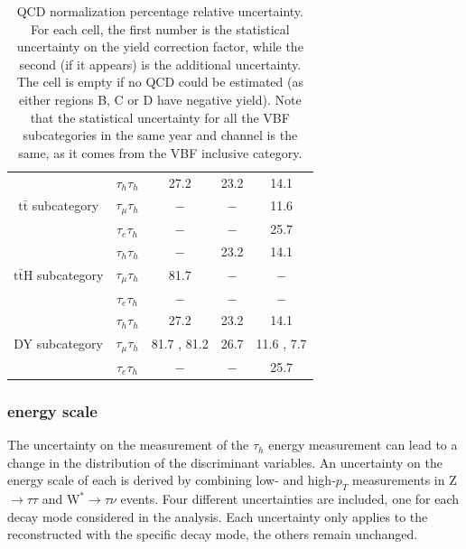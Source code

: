 \documentclass[../main.tex]{subfiles}
\begin{document}
\begin{table}[!h]
\begin{center}
\begin{tabular}{c | c | c | c | c}
                                        & $\tau_h\tau_h$   & 27.2         & 23.2         & 14.1         \\
    $\text{t}\bar{\text{t}}$ subcategory& $\tau_\mu\tau_h$ & $-$          & $-$          & 11.6         \\
                                        & $\tau_e\tau_h$   & $-$          & $-$          & 25.7         \\
    \hline
                                        & $\tau_h\tau_h$   & $-$          & 23.2         & 14.1         \\
    $\text{t}\bar{\text{t}}$H subcategory                    & $\tau_\mu\tau_h$ & 81.7         & $-$          & $-$          \\
                                        & $\tau_e\tau_h$   & $-$          & $-$          & $-$          \\
    \hline
                                        & $\tau_h\tau_h$   & 27.2         & 23.2         & 14.1         \\
    DY subcategory                     & $\tau_\mu\tau_h$ & 81.7 , 81.2  & 26.7         & 11.6 , 7.7   \\
                                        & $\tau_e\tau_h$   & $-$          & $-$          & 25.7         \\
     \hline
    \end{tabular}
  \end{center}
    \caption{QCD normalization percentage relative uncertainty. For each cell, the first number is the statistical uncertainty on the yield correction factor, while the second (if it appears) is the additional uncertainty.
    The cell is empty if no QCD could be estimated (as either regions B, C or D have negative yield). Note that the statistical uncertainty for all the VBF subcategories in the same year and channel is the same, as it comes from the VBF inclusive category.}
	\label{hh:tab:qcd_unc}
\end{table}

\subsubsection*{\tauh{} energy scale}

The uncertainty on the measurement of the $\tau_h$ energy measurement can lead to a change in the distribution of the discriminant variables. An uncertainty on the energy scale of each \tauh{} is derived by combining low- and high-$p_T$ measurements in Z$\to\tau\tau$ and $\text{W}^*\to\tau\nu$ events. Four different uncertainties are included, one for each \tauh{} decay mode considered in the analysis. Each uncertainty only applies to the \tauh{} reconstructed with the specific decay mode, the others remain unchanged.
\end{document}
